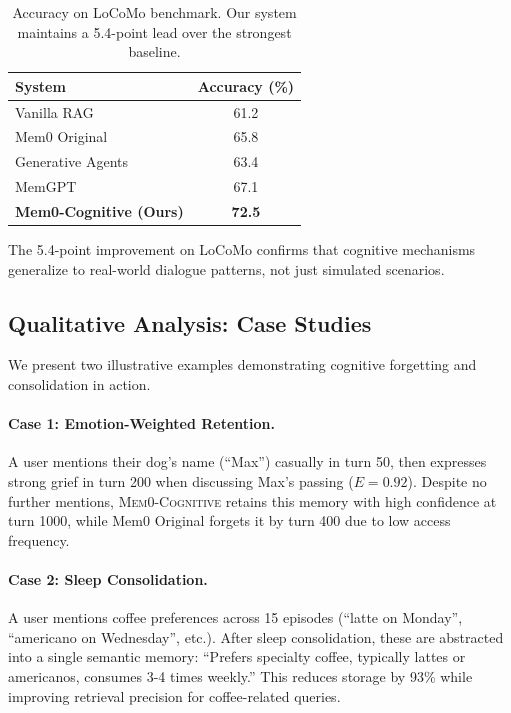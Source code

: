 \begin{table}[h]
\centering
\small
\begin{tabular}{lc}
\toprule
\textbf{System} & \textbf{Accuracy (\%)} \\
\midrule
Vanilla RAG & 61.2 \\
Mem0 Original & 65.8 \\
Generative Agents & 63.4 \\
MemGPT & 67.1 \\
\midrule
\textbf{Mem0-Cognitive (Ours)} & \textbf{72.5} \\
\bottomrule
\end{tabular}
\caption{Accuracy on LoCoMo benchmark. Our system maintains a 5.4-point lead over the strongest baseline.}
\label{tab:locomo}
\end{table}

The 5.4-point improvement on LoCoMo confirms that cognitive mechanisms generalize to real-world dialogue patterns, not just simulated scenarios.

\subsection{Qualitative Analysis: Case Studies}
\label{subsec:case_studies}

We present two illustrative examples demonstrating cognitive forgetting and consolidation in action.

\paragraph{Case 1: Emotion-Weighted Retention.} A user mentions their dog's name (``Max'') casually in turn 50, then expresses strong grief in turn 200 when discussing Max's passing ($E=0.92$). Despite no further mentions, \textsc{Mem0-Cognitive} retains this memory with high confidence at turn 1000, while Mem0 Original forgets it by turn 400 due to low access frequency.

\paragraph{Case 2: Sleep Consolidation.} A user mentions coffee preferences across 15 episodes (``latte on Monday'', ``americano on Wednesday'', etc.). After sleep consolidation, these are abstracted into a single semantic memory: ``Prefers specialty coffee, typically lattes or americanos, consumes 3-4 times weekly.'' This reduces storage by 93\% while improving retrieval precision for coffee-related queries.

